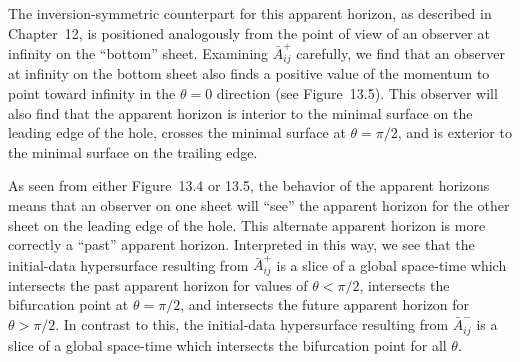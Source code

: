 The inversion-symmetric counterpart for this apparent horizon, as described in
Chapter~12, is positioned analogously from the point of view of an observer at
infinity on the ``bottom'' sheet.  Examining $\bar{A}^+_{ij}$ carefully, we find
that an observer at infinity on the bottom sheet also finds a positive value of
the momentum to point toward infinity in the $\theta=0$ direction (see
Figure~13.5).  This observer will  also find that the apparent horizon is
interior to the minimal surface on the leading edge of the hole, crosses the
minimal surface at $\theta=\pi/2$, and is exterior to the minimal surface on the
trailing edge.


As seen from either Figure~13.4 or 13.5, the behavior of the apparent horizons
means that an observer on one sheet will ``see'' the apparent horizon for the
other sheet on the leading edge of the hole.  This alternate apparent horizon is
more correctly a ``past'' apparent horizon.  Interpreted in this way, we see that
the initial-data hypersurface resulting from $\bar{A}^+_{ij}$ is a slice of a
global space-time which intersects the past apparent horizon for values of
$\theta<\pi/2$, intersects the bifurcation point at $\theta=\pi/2$, and
intersects the future apparent horizon for $\theta>\pi/2$.  In contrast to this,
the initial-data hypersurface resulting from $\bar{A}^-_{ij}$ is a slice of a
global space-time which intersects the bifurcation point for all $\theta$.


